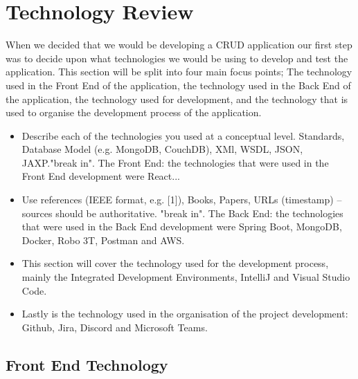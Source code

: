 \chapter{Technology Review}
 When we decided that we would be developing a CRUD application our first step was to decide upon what technologies we would be using to develop and test the application. This section will be split into four main focus points; The technology used in the Front End of the application, the technology used in the Back End of the application, the technology used for development, and the technology that is used to organise the development process of the application.
\begin{itemize}
\item Describe each of the technologies you used at a conceptual level. Standards, Database Model (e.g. MongoDB, CouchDB), XMl, WSDL, JSON, JAXP."break in". The Front End: the technologies that were used in the Front End development were React...
\item Use references (IEEE format, e.g. [1]), Books, Papers, URLs (timestamp) – sources should be authoritative. "break in". The Back End: the technologies that were used in the Back End development were Spring Boot, MongoDB, Docker, Robo 3T, Postman and AWS.
\item This section will cover the technology used for the development process, mainly the Integrated Development Environments, IntelliJ and Visual Studio Code.
\item Lastly is the technology used in the organisation of the project development: Github, Jira, Discord and Microsoft Teams.
\end{itemize}

\section{Front End Technology}
